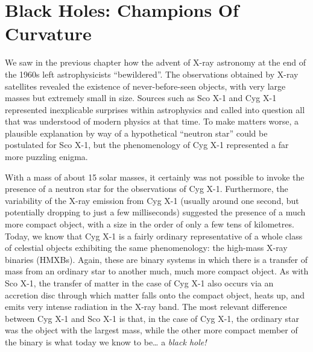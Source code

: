 \chapter{Black Holes: Champions Of Curvature}\label{ch:06}


We saw in the previous chapter how the advent of X-ray astronomy at
the end of the 1960s left astrophysicists ``bewildered''. The observations obtained by
X-ray satellites revealed the existence of never-before-seen objects,
with very large masses but extremely small in size. Sources such as Sco
X-1 and Cyg X-1 represented inexplicable surprises
within astrophysics and called into question all that was understood of modern physics
at that time. To make matters worse, a plausible explanation by way of a hypothetical
``neutron star'' could be postulated for Sco X-1, but the
phenomenology of Cyg X-1 represented a far more puzzling enigma.

With a mass of about 15 solar masses, it certainly was not possible to invoke the
presence of a neutron star for the observations of Cyg X-1.
Furthermore, the variability of the X-ray emission
from Cyg X-1 (usually around one second, but potentially dropping to just a few
milliseconds) suggested the presence of a much more compact object, with a size in the
order of only a few tens of kilometres. Today, we know that Cyg X-1 is a fairly ordinary
representative of a whole class of celestial objects exhibiting the same phenomenology:
the high-mass X-ray binaries (HMXBs). Again, these are binary systems
in which there is a transfer of mass from an ordinary star to another much, much more
compact object. As with Sco X-1, the transfer of matter in the case of
Cyg X-1 also occurs via an accretion disc through which matter falls
onto the compact object, heats up, and emits very intense radiation in the
X-ray band. The most relevant difference between Cyg X-1 and Sco
X-1 is that, in the case of Cyg X-1, the ordinary star was the object
with the largest mass, while the other more compact member of the binary is what today
we know to be\ldots{} a \emph{black hole!}

